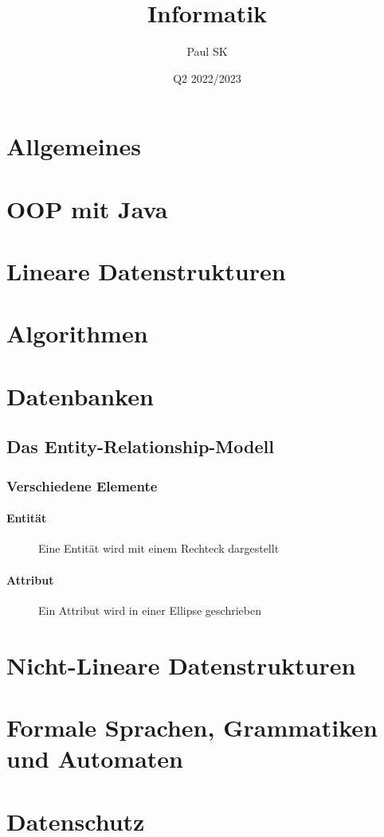 \documentclass{article}
\title{Informatik}
\date{Q2 2022/2023}
\author{Paul SK}
\begin{document}
	\maketitle
	\newpage


	\section{Allgemeines}

	\section{OOP mit Java}

	\section{Lineare Datenstrukturen}

	\section{Algorithmen}

	\section{Datenbanken}
	\subsection{Das Entity-Relationship-Modell}
	\subsubsection{Verschiedene Elemente}
	\paragraph{Entität}

	\begin{figure}[h!]
		\centering
		
		\caption{Eine Entität wird mit einem Rechteck dargestellt}
	\end{figure}	


	\paragraph{Attribut}

	\begin{figure}[h!]
		\centering
		
		\caption{Ein Attribut wird in einer Ellipse geschrieben}
	\end{figure}	

	\section{Nicht-Lineare Datenstrukturen}

	\section{Formale Sprachen, Grammatiken und Automaten}

	\section{Datenschutz}
\end{document}
